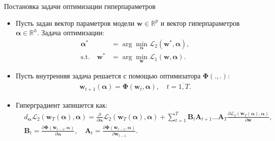\documentclass[aspectratio=169]{beamer}
\begin{document}


\begin{frame}{Постановка задачи оптимизации гиперпараметров}
\begin{itemize}
  \item Пусть задан вектор параметров модели $\mathbf{w} \in \mathbb{R}^p$ и вектор гиперпараметров
  $\boldsymbol{\alpha} \in \mathbb{R}^h$. Задача оптимизации:
  \begin{align*}
    \boldsymbol{\alpha}^* &= \arg\min_{\boldsymbol{\alpha}}\mathcal{L}_2(\mathbf{w}^*, \boldsymbol{\alpha}), \\
    \mathrm{s.t.} \quad \mathbf{w}^* &= \arg\min_{\mathbf{w}}\mathcal{L}_1(\mathbf{w}, \boldsymbol{\alpha}).
  \end{align*}
  \item Пусть внутренняя задача решается с помощью оптимизатора $\mathbf{\Phi}(., .)$:
  \begin{align*}
    \mathbf{w}_{t + 1}(\boldsymbol{\alpha}) = \mathbf{\Phi}(\mathbf{w}_t, \boldsymbol{\alpha}), \quad
    t = \overline{1, T}.
  \end{align*}
  \item Гиперградиент запишется как:
  \begin{align*}
    &d_{\boldsymbol{\alpha}}\mathcal{L}_2(\mathbf{w}_T(\boldsymbol{\alpha}), \boldsymbol{\alpha}) = 
    \frac{\partial}{\partial \boldsymbol{\alpha}}\mathcal{L}_2(\mathbf{w}_T(\boldsymbol{\alpha}), \boldsymbol{\alpha}) + 
    \sum_{t=1}^T\mathbf{B}_t\mathbf{A}_{t+1}\ldots\mathbf{A}_T
    \frac{\partial \mathcal{L}_2(\mathbf{w}_T(\boldsymbol{\alpha}), \boldsymbol{\alpha})}{\partial\mathbf{w}}, \\
    &\mathbf{B}_t = \frac{\partial\mathbf{\Phi}(\mathbf{w}_{t-1}, \boldsymbol{\alpha})}{\partial\boldsymbol{\alpha}},
    \quad \mathbf{A}_t = \frac{\partial\mathbf{\Phi}(\mathbf{w}_{t-1}, \boldsymbol{\alpha})}{\partial\boldsymbol{w}_{t - 1}}.
  \end{align*}
\end{itemize}
\end{frame}
\end{document}
